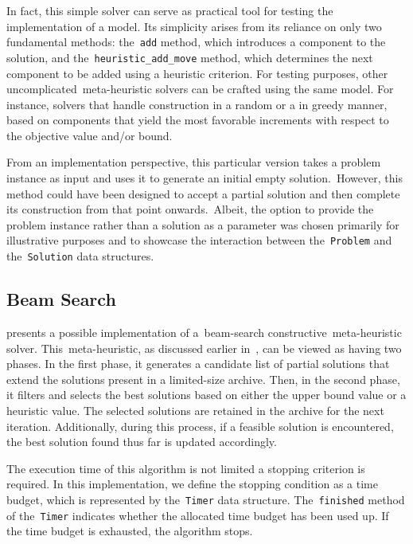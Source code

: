 In fact, this simple solver can serve as practical tool for testing the
implementation of a model. Its simplicity arises from its reliance on only two
fundamental methods: the~\texttt{add} method, which introduces a component to
the solution, and the~\texttt{heuristic\_add\_move} method, which determines the
next component to be added using a heuristic criterion. For testing purposes,
other uncomplicated~\acrshort{meta-heuristic} solvers can be crafted using the
same model. For instance, solvers that handle construction in a random or a
in greedy manner, based on components that yield the most favorable increments
with respect to the objective value and/or bound.

From an implementation perspective, this particular version takes a problem
instance as input and uses it to generate an initial empty solution.~However,
this method could have been designed to accept a partial solution and then
complete its construction from that point onwards.~Albeit, the option
to provide the problem instance rather than a solution as a parameter was chosen
primarily for illustrative purposes and to showcase the interaction between
the~\texttt{Problem} and the~\texttt{Solution} data structures.

\subsection{Beam Search}
\label{subsec:beam-search-solver}

 presents a possible implementation of a~\acrshort{beam-search}
constructive~\acrshort{meta-heuristic} solver. This~\acrshort{meta-heuristic},
as discussed earlier in~, can be viewed as having two phases. In the
first phase, it generates a candidate list of partial solutions that extend the
solutions present in a limited-size archive. Then, in the second phase, it
filters and selects the best solutions based on either the upper bound value or
a heuristic value. The selected solutions are retained in the archive for the
next iteration. Additionally, during this process, if a feasible solution is
encountered, the best solution found thus far is updated accordingly.

The execution time of this algorithm is not limited a stopping criterion is
required. In this implementation, we define the stopping condition as a time
budget, which is represented by the~\texttt{Timer} data structure.
The~\texttt{finished} method of the~\texttt{Timer} indicates whether the
allocated time budget has been used up. If the time budget is exhausted, the
algorithm stops.

